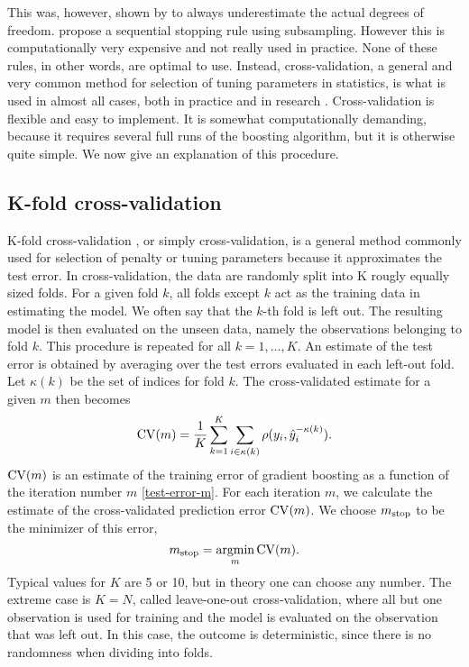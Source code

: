 This was, however, shown by \citet{hastie2007} to always underestimate the actual degrees of freedom.
\citet{mayr-hofner} propose a sequential stopping rule using subsampling.
However this is computationally very expensive and not really used in practice.
None of these rules, in other words, are optimal to use.
Instead, cross-validation, a general and very common method for selection of tuning parameters in statistics, is what is used in almost all cases, both in practice and in research \citep{mayr14a,mayr14b,mayr17}.
Cross-validation is flexible and easy to implement.
It is somewhat computationally demanding, because it requires several full runs of the boosting algorithm, but it is otherwise quite simple.
We now give an explanation of this procedure.


\subsection{K-fold cross-validation}\label{subsec:K-fold}
K-fold cross-validation \citep{lachenbruch}, or simply cross-validation, is a general method commonly used for selection of penalty or tuning parameters because it approximates the test error.
In cross-validation, the data are randomly split into K rougly equally sized folds.
For a given fold $k$, all folds except $k$ act as the training data in estimating the model.
We often say that the $k$-th fold is left out.
The resulting model is then evaluated on the unseen data, namely the observations belonging to fold $k$.
This procedure is repeated for all $k=1,\ldots,K$.
An estimate of the test error is obtained by averaging over the test errors evaluated in each left-out fold.
Let $\kappa(k)$ be the set of indices for fold $k$.
The cross-validated estimate for a given $m$ then becomes
\begin{equation*}
    \operatorname{CV}(m)=\frac{1}{K}\sum_{k=1}^K\sum_{i\in\kappa(k)}\rho(y_i,\hat{y}_i^{-\kappa(k)}).
\end{equation*}
$\operatorname{CV}(m)$ is an estimate of the training error of gradient boosting as a function of the iteration number $m$ \eqref{test-error-m}.
For each iteration $m$, we calculate the estimate of the cross-validated prediction error $\operatorname{CV}(m)$.
We choose $m_{\text{stop}}$ to be the minimizer of this error,
\begin{equation*}
    m_{\text{stop}}=\operatorname*{argmin}_{m}\operatorname{CV}(m).
\end{equation*}
Typical values for $K$ are 5 or 10, but in theory one can choose any number. The extreme case is $K=N$, called leave-one-out cross-validation, where all but one observation is used for training and the model is evaluated on the observation that was left out. In this case, the outcome is deterministic, since there is no randomness when dividing into folds.

